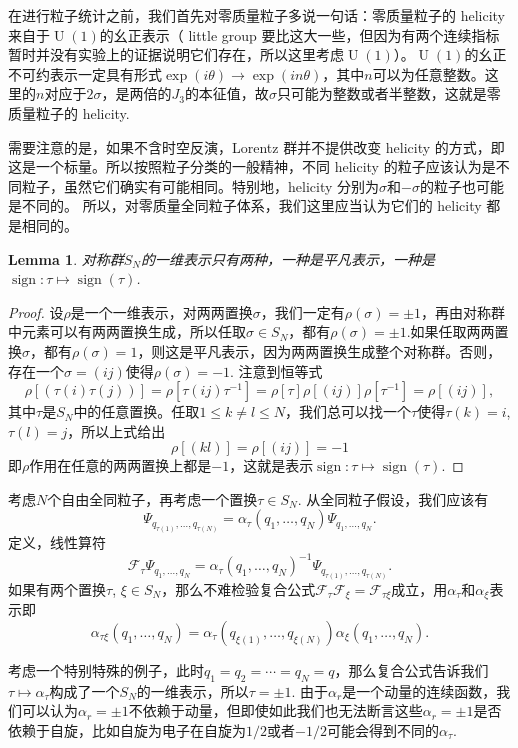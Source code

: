 \documentclass[11pt]{article}
\theoremstyle{definition}
\theoremstyle{plain}
\newtheorem{lem}[para]{Lemma}
\begin{document}
在进行粒子统计之前，我们首先对零质量粒子多说一句话：零质量粒子的 helicity 来自于$\operatorname{U}(1)$的幺正表示（ little group 要比这大一些，但因为有两个连续指标暂时并没有实验上的证据说明它们存在，所以这里考虑$\operatorname{U}(1)$）。$\operatorname{U}(1)$的幺正不可约表示一定具有形式$\exp(i\theta)\to \exp(in\theta)$，其中$n$可以为任意整数。这里的$n$对应于$2\sigma$，是两倍的$J_3$的本征值，故$\sigma$只可能为整数或者半整数，这就是零质量粒子的 helicity. 

需要注意的是，如果不含时空反演，Lorentz 群并不提供改变 helicity 的方式，即这是一个标量。所以按照粒子分类的一般精神，不同 helicity 的粒子应该认为是不同粒子，虽然它们确实有可能相同。特别地，helicity 分别为$\sigma$和$-\sigma$的粒子也可能是不同的。
所以，对零质量全同粒子体系，我们这里应当认为它们的 helicity 都是相同的。

\begin{lem}
对称群$S_N$的一维表示只有两种，一种是平凡表示，一种是$\operatorname{sign}:\tau\mapsto \operatorname{sign}(\tau)$. 
\end{lem}

\begin{proof}
设$\rho$是一个一维表示，对两两置换$\sigma$，我们一定有$\rho(\sigma)=\pm 1$，再由对称群中元素可以有两两置换生成，所以任取$\sigma\in S_N$，都有$\rho(\sigma)=\pm 1$.如果任取两两置换$\sigma$，都有$\rho(\sigma)=1$，则这是平凡表示，因为两两置换生成整个对称群。否则，存在一个$\sigma=(ij)$使得$\rho(\sigma)=-1$. 注意到恒等式
\[
	\rho[(\tau(i)\tau(j))]=\rho[\tau (ij)\tau^{-1}]=\rho[\tau]\rho[(ij)]\rho[\tau^{-1}]=\rho[(ij)],
\]
其中$\tau$是$S_N$中的任意置换。任取$1\leq k\neq l\leq N$，我们总可以找一个$\tau$使得$\tau(k)=i$, $\tau(l)=j$，所以上式给出
\[
	\rho[(kl)]=\rho[(ij)]=-1
\]
即$\rho$作用在任意的两两置换上都是$-1$，这就是表示$\operatorname{sign}:\tau\mapsto \operatorname{sign}(\tau)$.
\end{proof}

考虑$N$个自由全同粒子，再考虑一个置换$\tau\in S_N$. 从全同粒子假设，我们应该有
\[
	\Psi_{q_{\tau(1)},\dots,q_{\tau(N)}}=\alpha_\tau(q_1,\dots,q_N)\Psi_{q_1,\dots,q_N}.
\]
定义，线性算符
\[
	\mathscr{F}_\tau \Psi_{q_1,\dots,q_N}= \alpha_\tau(q_1,\dots,q_N)^{-1} \Psi_{q_{\tau(1)},\dots,q_{\tau(N)}}.
\]
如果有两个置换$\tau$, $\xi\in S_N$，那么不难检验复合公式$\mathscr{F}_{\tau}\mathscr{F}_{\xi}=\mathscr{F}_{\tau\xi}$成立，用$\alpha_\tau$和$\alpha_\xi$表示即
\[
	\alpha_{\tau\xi}(q_1,\dots,q_N)=\alpha_{\tau}(q_{\xi(1)},\dots,q_{\xi(N)})\alpha_{\xi}(q_1,\dots,q_N).
\]

考虑一个特别特殊的例子，此时$q_1=q_2=\cdots=q_N=q$，那么复合公式告诉我们$\tau \mapsto \alpha_\tau$构成了一个$S_N$的一维表示，所以$\tau=\pm 1$. 由于$\alpha_r$是一个动量的连续函数，我们可以认为$\alpha_r=\pm 1$不依赖于动量，但即使如此我们也无法断言这些$\alpha_r=\pm 1$是否依赖于自旋，比如自旋为电子在自旋为$1/2$或者$-1/2$可能会得到不同的$\alpha_\tau$. 
\end{document}

